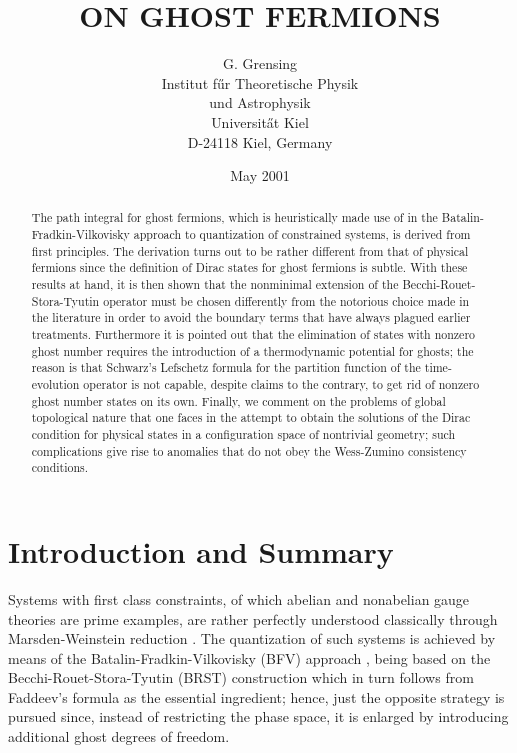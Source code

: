 \documentclass[a4paper,10pt]{article}
\begin{document}
\title{ON GHOST FERMIONS}

\author{G. Grensing\\ Institut f\H ur Theoretische Physik \\und Astrophysik \\ 
Universit\H at Kiel \\D-24118 Kiel, 
Germany}


\date{May 2001}

\maketitle

\begin{abstract}

The path integral for ghost fermions, which is heuristically made use of in the Batalin-
Fradkin-Vilkovisky approach to quantization of constrained systems, is derived from first 
principles. The derivation turns out to be rather different from that of physical 
fermions since the definition of Dirac states for ghost fermions is subtle. With these 
results at hand, it is then shown that the nonminimal extension of the 
Becchi-Rouet-Stora-Tyutin operator must be chosen differently from the notorious choice 
made in the literature in order to avoid the boundary terms that have always plagued 
earlier treatments. Furthermore it is pointed out that the elimination of states with 
nonzero ghost number requires the introduction of a thermodynamic potential for ghosts; 
the reason is that Schwarz's Lefschetz formula for the partition function of the time-
evolution operator is not capable, despite claims to the contrary, to get rid of nonzero 
ghost number states on its own. Finally, we comment on the problems of global topological 
nature that one faces in the attempt to obtain the solutions of the Dirac condition for physical states
in a configuration space of nontrivial geometry; such complications give rise to anomalies 
that do not obey the Wess-Zumino consistency conditions.
\end{abstract}
\thispagestyle{empty}
\newpage
\setcounter{page}{1}
\section*{Introduction and Summary}

Systems with first class constraints, of which abelian and nonabelian gauge theories are 
prime examples, are rather perfectly understood classically through Marsden-Weinstein 
reduction \cite{Wood 92}. The quantization of such systems is achieved by means of the 
Batalin-Fradkin-Vilkovisky (BFV) approach \cite{Frad 75,Bata 77,Frad 78}, being based on 
the Becchi-Rouet-Stora-Tyutin (BRST) construction which in turn follows from Faddeev's 
formula \cite {Fadd 69} as the essential ingredient; hence, just the opposite strategy is 
pursued since, instead of restricting the phase space, it is enlarged by introducing additional 
ghost degrees of freedom.
\end{document}
